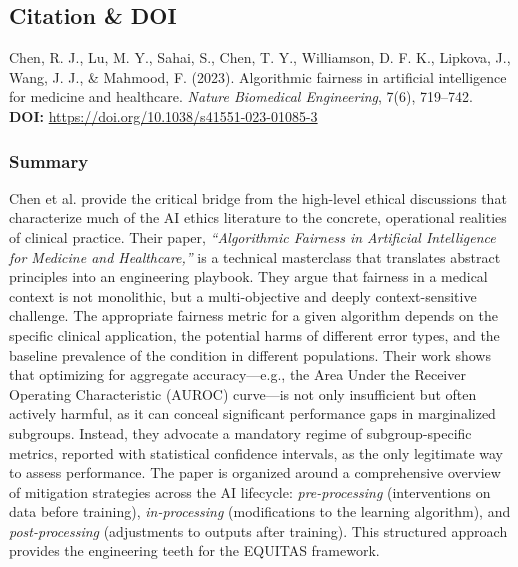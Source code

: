 \documentclass[11pt,twoside]{article}
\begin{document}
\vspace{-0.3cm}
\subsection*{Citation \& DOI}

\vspace{-0.3cm}
Chen, R. J., Lu, M. Y., Sahai, S., Chen, T. Y., Williamson, D. F. K., Lipkova, J., Wang, J. J., \& Mahmood, F. (2023). Algorithmic fairness in artificial intelligence for medicine and healthcare. \textit{Nature Biomedical Engineering}, 7(6), 719--742. \\
\textbf{DOI:} \href{https://doi.org/10.1038/s41551-023-01085-3}{https://doi.org/10.1038/s41551-023-01085-3}

\vspace{-0.3cm}
\subsubsection*{Summary}

\vspace{-0.3cm}
Chen et al. provide the critical bridge from the high-level ethical discussions that characterize much of the AI ethics literature to the concrete, operational realities of clinical practice. Their paper, \textit{“Algorithmic Fairness in Artificial Intelligence for Medicine and Healthcare,”} is a technical masterclass that translates abstract principles into an engineering playbook. They argue that fairness in a medical context is not monolithic, but a multi-objective and deeply context-sensitive challenge. The appropriate fairness metric for a given algorithm depends on the specific clinical application, the potential harms of different error types, and the baseline prevalence of the condition in different populations. Their work shows that optimizing for aggregate accuracy—e.g., the Area Under the Receiver Operating Characteristic (AUROC) curve—is not only insufficient but often actively harmful, as it can conceal significant performance gaps in marginalized subgroups. Instead, they advocate a mandatory regime of subgroup-specific metrics, reported with statistical confidence intervals, as the only legitimate way to assess performance. The paper is organized around a comprehensive overview of mitigation strategies across the AI lifecycle: \textit{pre-processing} (interventions on data before training), \textit{in-processing} (modifications to the learning algorithm), and \textit{post-processing} (adjustments to outputs after training). This structured approach provides the engineering teeth for the \textsc{EQUITAS} framework.
\end{document}
